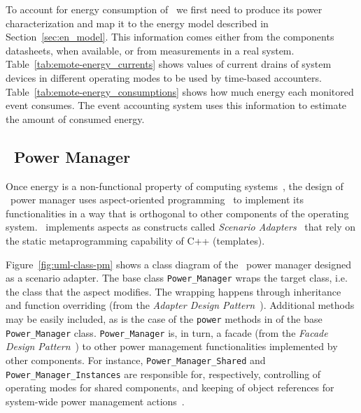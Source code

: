 
To account for energy consumption of \emote~we first need to produce its power characterization and map it to the energy model described in Section~\ref{sec:en_model}.
This information comes either from the components datasheets, when available, or from measurements in a real system.
Table~\ref{tab:emote-energy_currents} shows values of current drains of system devices in different operating modes to be used by time-based accounters.
Table~\ref{tab:emote-energy_consumptions} shows how much energy each monitored event consumes.
The event accounting system uses this information to estimate the amount of consumed energy.



\subsection{\epos~Power Manager}
\label{sec:epospm}

Once energy is a non-functional property of computing systems~\cite{Lohmann:2005}, the design of \epos~power manager uses aspect-oriented programming~\cite{Mens:1997} to implement its functionalities in a way that is orthogonal to other components of the operating system.
\epos~implements aspects as constructs called \emph{Scenario Adapters}~\cite{Frohlich:SCI:2000} that rely on the static metaprogramming capability of C++ (templates).%


Figure~\ref{fig:uml-class-pm} shows a class diagram of the \epos~power manager designed as a scenario adapter.
The base class \texttt{Power\_Manager} wraps the target class, i.e. the class that the aspect modifies.
The wrapping happens through inheritance and function overriding (from the \emph{Adapter Design Pattern}~\cite{GangOfFour:1994}).
Additional methods may be easily included, as is the case of the \texttt{power} methods in of the base \texttt{Power\_Manager} class.
\texttt{Power\_Manager} is, in turn, a facade (from the \emph{Facade Design Pattern}~\cite{GangOfFour:1994}) to other power management functionalities implemented by other components.
For instance, \texttt{Power\_Manager\_Shared} and \texttt{Power\_Manager\_Instances} are responsible for, respectively, controlling of operating modes for shared components, and keeping of object references for system-wide power management actions~\cite{Hoeller:DIPES:2006}.

